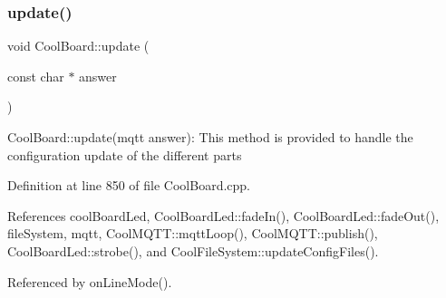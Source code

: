 \subsubsection{\texorpdfstring{update()}{update()}}
{\footnotesize\ttfamily void Cool\+Board\+::update (\begin{DoxyParamCaption}\item[{const char $\ast$}]{answer }\end{DoxyParamCaption})}

Cool\+Board\+::update(mqtt answer)\+: This method is provided to handle the configuration update of the different parts 

Definition at line 850 of file Cool\+Board.\+cpp.



References cool\+Board\+Led, Cool\+Board\+Led\+::fade\+In(), Cool\+Board\+Led\+::fade\+Out(), file\+System, mqtt, Cool\+M\+Q\+T\+T\+::mqtt\+Loop(), Cool\+M\+Q\+T\+T\+::publish(), Cool\+Board\+Led\+::strobe(), and Cool\+File\+System\+::update\+Config\+Files().



Referenced by on\+Line\+Mode().


